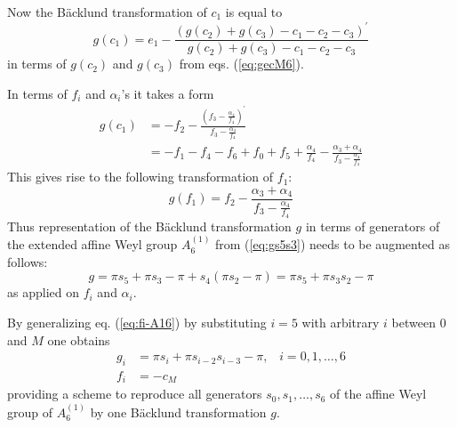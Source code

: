 \documentclass[12pt]{article}
\numberwithin{equation}{section}
\def\rf#1{(\ref{eq:#1})}
\def\lab#1{\label{eq:#1}}
\begin{document}
Now the B\"acklund transformation of $c_1$ is equal to 
\begin{equation}
g\left( c_1\right) = e_1-\frac{\left(g(c_2)+g(c_3) -c_1-c_2-c_3\right)^{\prime}}{g(c_2)+g(c_3) -c_1-c_2-c_3}
\lab{gcone}
\end{equation}
in terms of $g(c_2)$ and $g(c_3)$ from eqs. \rf{gecM6}.

In terms of $f_i$ and $\alpha_i$'s it takes a form
\[
\begin{split}
g\left( c_1\right) &= -f_2 - \frac{\left(f_3-\frac{\alpha_4}{f_4}\right)^{\prime}}{f_3-\frac{\alpha_4}{f_4}}\\
&= -f_1-f_4-f_6+f_0+f_5+\frac{\alpha_4}{f_4}
-\frac{\alpha_3+\alpha_4}{f_3-\frac{\alpha_4}{f_4}}
\end{split}
\]
This gives rise to the following transformation of $f_1$:
\[
g(f_1) = f_2 - \frac{\alpha_3+\alpha_4}{f_3-\frac{\alpha_4}{f_4}}
\]
Thus representation of the B\"acklund transformation $g$ in terms 
of generators of the extended affine Weyl group $A^{(1)}_6$
from \rf{gs5s3} needs to be augmented as follows:
\[
g = \pi s_5+\pi s_3 -\pi + s_4 \left(\pi s_2 -\pi\right)=
 \pi s_5+\pi s_3 s_2 -\pi 
\]
as applied on $f_i$ and $\alpha_i$.

By generalizing eq. \rf{fi-A16} by substituting $i=5$ with arbitrary
$i$ between $0$ and $M$ one obtains
\[
\begin{split}
g_i &= \pi s_i+\pi s_{i-2} s_{i-3}  -\pi,\;\;\;  i=0,1, \ldots, 6\\
f_i &= -c_M
\end{split}
\]
providing a scheme to reproduce all generators 
$s_0, s_1, \ldots, s_6$ of the affine Weyl group of $A^{(1)}_6$
by one B\"acklund transformation $g$.
\end{document}
